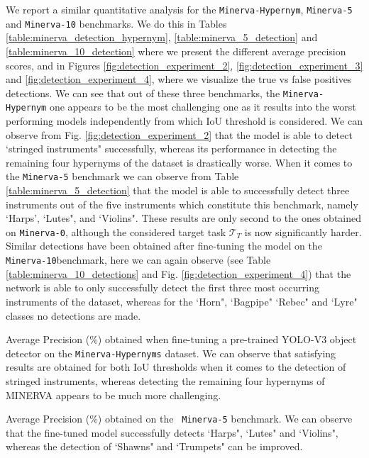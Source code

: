 We report a similar quantitative analysis for the \texttt{Minerva-Hypernym}, \texttt{Minerva-5} and \texttt{Minerva-10} benchmarks. We do this in Tables \ref{table:minerva_detection_hypernym}, \ref{table:minerva_5_detection} and \ref{table:minerva_10_detection} where we present the different average precision scores, and in Figures \ref{fig:detection_experiment_2}, \ref{fig:detection_experiment_3} and \ref{fig:detection_experiment_4}, where we visualize the true vs false positives detections. We can see that out of these three benchmarks, the \texttt{Minerva-Hypernym} one appears to be the most challenging one as it results into the worst performing models independently from which IoU threshold is considered. We can observe from Fig. \ref{fig:detection_experiment_2} that the model is able to detect `stringed instruments" successfully, whereas its performance in detecting the remaining four hypernyms of the dataset is drastically worse. When it comes to the \texttt{Minerva-5} benchmark we can observe from Table \ref{table:minerva_5_detection} that the model is able to successfully detect three instruments out of the five instruments which constitute this benchmark, namely `Harps', `Lutes", and `Violins". These results are only second to the ones obtained on \texttt{Minerva-0}, although the considered target task $\mathcal{T}_T$ is now significantly harder. Similar detections have been obtained after fine-tuning the model on the \texttt{Minerva-10}benchmark, here we can again observe (see Table \ref{table:minerva_10_detections} and Fig. \ref{fig:detection_experiment_4}) that the network is able to only successfully detect the first three most occurring instruments of the dataset, whereas for the `Horn", `Bagpipe" `Rebec" and `Lyre" classes no detections are made. 

\begin{table}[ht!]
	\caption{Average Precision ($\%$) obtained when fine-tuning a pre-trained YOLO-V3 object detector on the \texttt{Minerva-Hypernyms} dataset. We can observe that satisfying results are obtained for both IoU thresholds when it comes to the detection of stringed instruments, whereas detecting the remaining four hypernyms of MINERVA appears to be much more challenging.}
\resizebox{\columnwidth}{!}{%
}
\label{table:minerva_detection_hypernyms}
\end{table}


\begin{table}[ht!]
	\caption{Average Precision ($\%$) obtained on the \texttt{ Minerva-5} benchmark. We can observe that the fine-tuned model successfully detects `Harps", `Lutes" and `Violins", whereas the detection of `Shawns" and `Trumpets" can be improved.}
\resizebox{\columnwidth}{!}{%
}
\label{table:minerva_5_detection}
\end{table}



